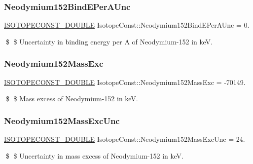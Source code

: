 \subsubsection{\texorpdfstring{Neodymium152\+Bind\+E\+Per\+A\+Unc}{Neodymium152BindEPerAUnc}}
{\footnotesize\ttfamily \mbox{\hyperlink{group___isotope_const-_macros_ga8f45a7272ce02c0b4c65c44636ed719a}{I\+S\+O\+T\+O\+P\+E\+C\+O\+N\+S\+T\+\_\+\+D\+O\+U\+B\+LE}} Isotope\+Const\+::\+Neodymium152\+Bind\+E\+Per\+A\+Unc = 0.}

\$ \$ Uncertainty in binding energy per A of Neodymium-\/152 in keV. \mbox{\label{group___isotope_const-_neodymium-_nd152_ga766db37b0e134c00d2a24d34200237d0}} 
\subsubsection{\texorpdfstring{Neodymium152\+Mass\+Exc}{Neodymium152MassExc}}
{\footnotesize\ttfamily \mbox{\hyperlink{group___isotope_const-_macros_ga8f45a7272ce02c0b4c65c44636ed719a}{I\+S\+O\+T\+O\+P\+E\+C\+O\+N\+S\+T\+\_\+\+D\+O\+U\+B\+LE}} Isotope\+Const\+::\+Neodymium152\+Mass\+Exc = -\/70149.}

\$ \$ Mass excess of Neodymium-\/152 in keV. \mbox{\label{group___isotope_const-_neodymium-_nd152_ga42a449ac9b571caf0ba0f3cc6510f994}} 
\subsubsection{\texorpdfstring{Neodymium152\+Mass\+Exc\+Unc}{Neodymium152MassExcUnc}}
{\footnotesize\ttfamily \mbox{\hyperlink{group___isotope_const-_macros_ga8f45a7272ce02c0b4c65c44636ed719a}{I\+S\+O\+T\+O\+P\+E\+C\+O\+N\+S\+T\+\_\+\+D\+O\+U\+B\+LE}} Isotope\+Const\+::\+Neodymium152\+Mass\+Exc\+Unc = 24.}

\$ \$ Uncertainty in mass excess of Neodymium-\/152 in keV. \mbox{\label{group___isotope_const-_neodymium-_nd152_ga5b9b229177b8845abaec4a70f13971ec}} 

